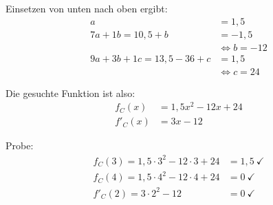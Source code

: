 \documentclass[11pt, a4paper,
]{scrartcl}
\begin{document}
\begin{aufgabe}
\begin{loesung}
\begin{description}
				Einsetzen von unten nach oben ergibt:
				\begin{align*}
				a &= 1,5 \\
				7a + 1b = 10,5 + b &= -1,5 \\
				&\Leftrightarrow b = -12 \\
				9a + 3b + 1c = 13,5 - 36 + c &= 1,5 \\
				&\Leftrightarrow c = 24
				\end{align*}

				Die gesuchte Funktion ist also:
				\begin{align*}
					f_C(x) &= 1,5x^2 - 12x + 24 \\
					f'_C(x) &= 3x - 12
				\end{align*}

				Probe:
				\begin{align*}
				f_C(3) = 1,5\cdot 3^2 - 12\cdot 3 + 24 &= 1,5 \ \checkmark \\
				f_C(4) = 1,5\cdot 4^2 - 12\cdot 4 + 24 &= 0 \ \checkmark \\
				f'_C(2) = 3\cdot 2^2 - 12 &= 0 \ \checkmark
				\end{align*}
			\end{description}
		\end{loesung}
	\end{aufgabe}
\end{document}
